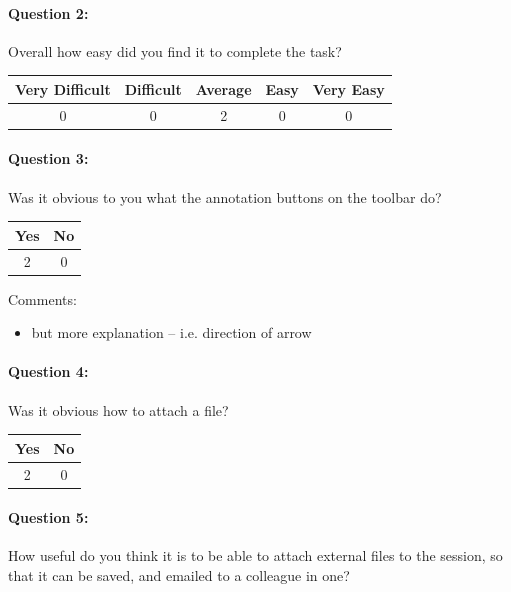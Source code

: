 \paragraph*{Question 2: } Overall how easy did you find it to complete the task?

\begin{center}
\begin{tabular}{ | c | c | c | c | c |}
    \hline
    Very Difficult & Difficult & Average & Easy & Very Easy \\
    \hline
    0 & 0 & 2 & 0 & 0 \\
    \hline
\end{tabular}
\end{center}

\paragraph*{Question 3: } Was it obvious to you what the annotation buttons on the toolbar do?

\begin{center}
\begin{tabular}{ | c | c |}
    \hline
    Yes & No\\
    \hline
    2 & 0 \\
    \hline
\end{tabular}
\end{center}

Comments:
\begin{itemize}
\item but more explanation -- i.e. direction of arrow
\end{itemize}

\paragraph*{Question 4: } Was it obvious how to attach a file?

\begin{center}
\begin{tabular}{ | c | c |}
    \hline
    Yes & No\\
    \hline
    2 & 0 \\
    \hline
\end{tabular}
\end{center}

\paragraph*{Question 5: } How useful do you think it is to be able to attach external files to the session, so that it can be saved, and emailed to a colleague in one?

